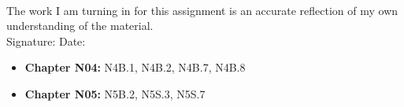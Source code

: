 \documentclass[12pt]{article}
\begin{document}
\\

\bigskip
\bigskip

\noindent The work I am turning in for this assignment is an accurate
reflection of my own understanding of the material.\\[14pt]

\noindent Signature: \underline{\hspace{7cm}} \hspace{1cm} Date:
\underline{\hspace{5cm}}\\



\hline 

\medskip
\begin{itemize}
\item {\bf Chapter N04:} N4B.1, N4B.2, N4B.7, N4B.8
\item {\bf Chapter N05:} N5B.2, N5S.3, N5S.7
\end{itemize}
\end{document}
